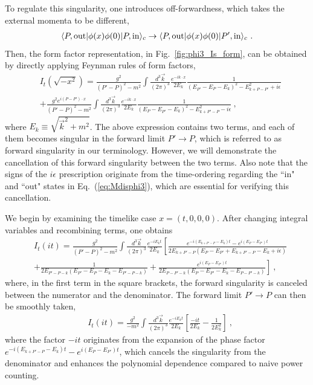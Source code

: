 \documentclass[a4paper,11pt]{article}
\begin{document}
To regulate this singularity, one introduces off-forwardness, which takes the external momenta to be different,
\begin{align}
\langle P, {\rm out} | \phi(x) \phi(0) | P, {\rm in} \rangle_c \rightarrow \langle P, {\rm out} | \phi(x) \phi(0) | P', {\rm in} \rangle_c \ .
\end{align}
Then, the form factor representation, in Fig.~\ref{fig:phi3_Is_form}, can be obtained by directly applying Feynman rules of form factors, 
\begin{align}\label{eq:It}
&I_{t}\left(\sqrt{-x^2}\right) =  \frac{g^2}{(P'-P)^2-m^2} \int \frac{d^{3} \vec{k}}{(2\pi)^{3}}  \frac{e^{-i k \cdot x}}{2 E_{k}}  \frac{1}{(E_{P'}-E_{P}-E_{k})^2-E_{k+P-P'}^2+i\epsilon} \nonumber\\
& +  \frac{g^2 e^{i (P-P') \cdot x}}{(P'-P)^2-m^2} \int \frac{d^{3} \vec{k}}{(2\pi)^{3}}  \frac{e^{-i k \cdot  x}}{2 E_{k}}  \frac{1}{(E_{P}-E_{P'}-E_{k})^2-E_{k+P'-P}^2-i\epsilon}  \ ,
\end{align}
where $E_{k} \equiv \sqrt{\vec{k}^2+m^2}$. The above expression contains two terms, and each of them becomes singular in the forward limit $P' \rightarrow P$, which is referred to as forward singularity in our terminology. However, we will demonstrate the cancellation of this forward singularity between the two terms. Also note that the signs of the $i \epsilon$ prescription originate from the time-ordering regarding the ``in" and ``out" states in Eq.~(\ref{eq:Mdisphi3}), which are essential for verifying this cancellation.

We begin by examining the timelike case $x=(t,0,0,0)$. After changing integral variables and recombining terms, one obtains
\begin{align}
&I_{t}\left(i t\right) = \frac{g^2}{(P'-P)^2-m^2} \int \frac{d^{3} \vec{k}}{(2\pi)^{3}} \frac{e^{-i E_k t}}{2 E_{k}} 
\left[ \frac{e^{-i\left(E_{k+P'-P}-E_k\right)t}-e^{i\left(E_P-E_{P'}\right) t}}{2 E_{k+P'-P}\left(E_P-E_{P'}+E_{k+P'-P}-E_k+i \epsilon \right)}  \right.\nonumber\\
&\left.+\frac{1}{2 E_{P'-P-k}\left(E_{P'}-E_P-E_k-E_{P'-P-k}\right)} + \frac{e^{i\left(E_P-E_{P'}\right) t}}{2 E_{P-P'-k}\left(E_P-E_{P'}-E_k-E_{P-P'-k}\right)} \right] \ ,
\end{align}
where, in the first term in the square brackets, the forward singularity is canceled between the numerator and the denominator. The forward limit $P'\rightarrow P$ can then be smoothly taken,
\begin{align}\label{eq:Istl}
&I_{t}\left(i t\right)  = \frac{g^2}{-m^2} \int \frac{d^{3} \vec{k}}{(2\pi)^{3}} \frac{e^{-i E_k t}}{2 E_{k}} 
\left[ \frac{-i t}{2 E_{k}}  - \frac{1}{2 E^2_{k}} \right] \ ,
\end{align}
where the factor $-i t$ originates from the expansion of the phase factor $e^{-i\left(E_{k+P'-P}-E_k\right)t}-e^{i\left(E_P-E_{P'}\right) t}$, which cancels the singularity from the denominator and enhances the polynomial dependence compared to naive power counting.  
\end{document}
